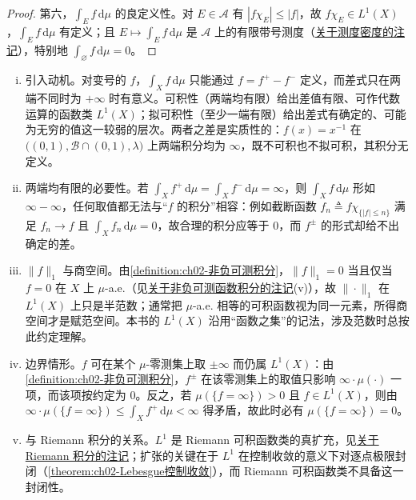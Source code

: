 \documentclass[../../main.tex]{subfiles}%
\begin{document}
\begin{proof}
第六，$\int_Ef\,\mathrm{d}\mu$ 的良定义性。对 $E\in\mathscr A$ 有 $|f\chi_E|\leqslant|f|$，故 $f\chi_E\in L^1(X)$，$\int_Ef\,\mathrm{d}\mu$ 有定义；且 $E\mapsto\int_Ef\,\mathrm{d}\mu$ 是 $\mathscr A$ 上的有限带号测度（\hyperref[remark:ch02-测度密度]{关于测度密度的注记}），特别地 $\int_\varnothing f\,\mathrm{d}\mu=0$。
\end{proof}

\begin{remark}\label{remark:ch02-可积拟可积动机}
\begin{enumerate}[(i)]
\item 引入动机。对变号的 $f$，$\int_Xf\,\mathrm{d}\mu$ 只能通过 $f=f^+-f^-$ 定义，而差式只在两端不同时为 $+\infty$ 时有意义。可积性（两端均有限）给出差值有限、可作代数运算的函数类 $L^1(X)$；拟可积性（至少一端有限）给出差式有确定的、可能为无穷的值这一较弱的层次。两者之差是实质性的：$f(x)=x^{-1}$ 在 $\big((0,1),\mathscr B\cap(0,1),\lambda\big)$ 上两端积分均为 $\infty$，既不可积也不拟可积，其积分无定义。
\item 两端均有限的必要性。若 $\int_Xf^+\,\mathrm{d}\mu=\int_Xf^-\,\mathrm{d}\mu=\infty$，则 $\int_Xf\,\mathrm{d}\mu$ 形如 $\infty-\infty$，任何取值都无法与“$f$ 的积分”相容：例如截断函数 $f_n\triangleq f\chi_{\{|f|\leqslant n\}}$ 满足 $f_n\to f$ 且 $\int_Xf_n\,\mathrm{d}\mu=0$，故合理的积分应等于 $0$，而 $f^\pm$ 的形式却给不出确定的差。
\item $\|f\|_1$ 与商空间。由\cref{definition:ch02-非负可测积分}，$\|f\|_1=0$ 当且仅当 $f=0$ 在 $X$ 上 $\mu$-a.e.（见\hyperref[remark:ch02-非负可测积分动机]{关于非负可测函数积分的注记}(v)），故 $\|\cdot\|_1$ 在 $L^1(X)$ 上只是半范数；通常把 $\mu$-a.e. 相等的可积函数视为同一元素，所得商空间才是赋范空间。本书的 $L^1(X)$ 沿用“函数之集”的记法，涉及范数时总按此约定理解。
\item 边界情形。$f$ 可在某个 $\mu$-零测集上取 $\pm\infty$ 而仍属 $L^1(X)$：由\cref{definition:ch02-非负可测积分}，$f^\pm$ 在该零测集上的取值只影响 $\infty\cdot\mu(\cdot)$ 一项，而该项按约定为 $0$。反之，若 $\mu(\{f=\infty\})>0$ 且 $f\in L^1(X)$，则由 $\infty\cdot\mu(\{f=\infty\})\leqslant\int_Xf^+\,\mathrm{d}\mu<\infty$ 得矛盾，故此时必有 $\mu(\{f=\infty\})=0$。
\item 与 Riemann 积分的关系。$L^1$ 是 Riemann 可积函数类的真扩充，见\hyperref[remark:ch02-Riemann可积]{关于 Riemann 积分的注记}；扩张的关键在于 $L^1$ 在控制收敛的意义下对逐点极限封闭（\cref{theorem:ch02-Lebesgue控制收敛}），而 Riemann 可积函数类不具备这一封闭性。
\end{enumerate}
\end{remark}
\end{document}

